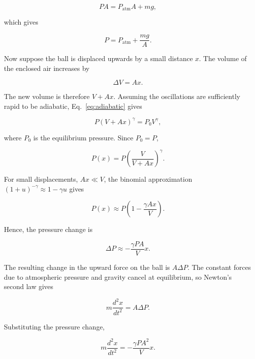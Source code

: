 \documentclass[12pt,a4paper]{article}
\begin{document}
\begin{equation}
    PA=P_{\mathrm{atm}}A+mg,
\end{equation}

which gives

\begin{equation}
    \boxed{P=P_{\mathrm{atm}}+\frac{mg}{A}}.
    \label{eq:equilibriumpressure}
\end{equation}

Now suppose the ball is displaced upwards by a small distance
$x$. The volume of the enclosed air increases by

\begin{equation}
    \Delta V=Ax.
\end{equation}

The new volume is therefore $V+Ax$. Assuming the oscillations
are sufficiently rapid to be adiabatic, Eq.~\eqref{eq:adiabatic}
gives

\begin{equation}
    P(V+Ax)^\gamma=P_0V^\gamma,
\end{equation}

where $P_0$ is the equilibrium pressure. Since $P_0=P$,

\begin{equation}
    P(x)=P\left(\frac{V}{V+Ax}\right)^\gamma.
\end{equation}

For small displacements, $Ax\ll V$, the binomial approximation
$(1+u)^{-\gamma}\approx1-\gamma u$ gives

\begin{equation}
    P(x)\approx P\left(1-\frac{\gamma Ax}{V}\right).
\end{equation}

Hence, the pressure change is

\begin{equation}
    \Delta P\approx-\frac{\gamma PA}{V}x.
\end{equation}

The resulting change in the upward force on the ball is
$A\Delta P$. The constant forces due to atmospheric pressure
and gravity cancel at equilibrium, so Newton's second law gives

\begin{equation}
    m\frac{d^2x}{dt^2}=A\Delta P.
\end{equation}

Substituting the pressure change,

\begin{equation}
    m\frac{d^2x}{dt^2}
    =-\frac{\gamma PA^2}{V}x.
\end{equation}
\end{document}
